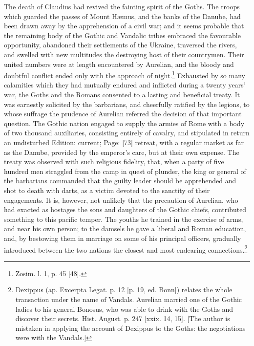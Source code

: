 The death of Claudius had revived the fainting spirit of the Goths. The troops which guarded the passes of Mount Hæmus, and the banks of the Danube, had been drawn away by the apprehension of a civil war; and it seems probable that the remaining body of the Gothic and Vandalic tribes embraced the favourable opportunity, abandoned their settlements of the Ukraine, traversed the rivers, and swelled with new multitudes the destroying host of their countrymen. Their united numbers were at length encountered by Aurelian, and the bloody and doubtful conflict ended only with the approach of night.\footnote{Zosim. l. 1, p. 45 [48].} Exhausted by so many calamities which they had mutually endured and inflicted during a twenty years\texthebrew{}’ war, the Goths and the Romans consented to a lasting and beneficial treaty. It was earnestly solicited by the barbarians, and cheerfully ratified by the legions, to whose suffrage the prudence of Aurelian referred the decision of that important question. The Gothic nation engaged to supply the armies of Rome with a body of two thousand auxiliaries, consisting entirely of cavalry, and stipulated in return an undisturbed Edition: current; Page: [73] retreat, with a regular market as far as the Danube, provided by the emperor\texthebrew{}’s care, but at their own expense. The treaty was observed with such religious fidelity, that, when a party of five hundred men straggled from the camp in quest of plunder, the king or general of the barbarians commanded that the guilty leader should be apprehended and shot to death with darts, as a victim devoted to the sanctity of their engagements. It is, however, not unlikely that the precaution of Aurelian, who had exacted as hostages the sons and daughters of the Gothic chiefs, contributed something to this pacific temper. The youths he trained in the exercise of arms, and near his own person; to the damsels he gave a liberal and Roman education, and, by bestowing them in marriage on some of his principal officers, gradually introduced between the two nations the closest and most endearing connections.\footnote{Dexippus (ap. Excerpta Legat. p. 12 [p. 19, ed. Bonn]) relates the whole transaction under the name of Vandals. Aurelian married one of the Gothic ladies to his general Bonosus, who was able to drink with the Goths and discover their secrets. Hist. August. p. 247 [xxix. 14, 15]. [The author is mistaken in applying the account of Dexippus to the Goths: the negotiations were with the Vandals.]}


